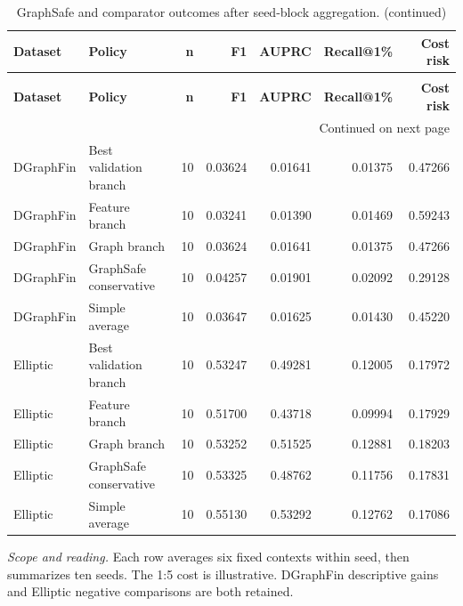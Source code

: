 \begingroup
\footnotesize
\setlength{\tabcolsep}{3pt}
\renewcommand{\arraystretch}{1.10}
\begin{longtable}{@{}p{} p{} r r r r r@{}}
\caption{GraphSafe and comparator outcomes after seed-block aggregation.}\label{tab:s-graphsafe-summary}\\
\toprule
\textbf{Dataset} & \textbf{Policy} & \textbf{n} & \textbf{F1} & \textbf{AUPRC} & \textbf{Recall@1\%} & \textbf{Cost risk} \\
\midrule
\endfirsthead
\caption[]{GraphSafe and comparator outcomes after seed-block aggregation. (continued)}\\
\toprule
\textbf{Dataset} & \textbf{Policy} & \textbf{n} & \textbf{F1} & \textbf{AUPRC} & \textbf{Recall@1\%} & \textbf{Cost risk} \\
\midrule
\endhead
\midrule
\multicolumn{7}{r}{\footnotesize Continued on next page}\\
\endfoot
\bottomrule
\endlastfoot
DGraphFin & Best validation branch & 10 & 0.03624 & 0.01641 & 0.01375 & 0.47266 \\
DGraphFin & Feature branch & 10 & 0.03241 & 0.01390 & 0.01469 & 0.59243 \\
DGraphFin & Graph branch & 10 & 0.03624 & 0.01641 & 0.01375 & 0.47266 \\
DGraphFin & GraphSafe conservative & 10 & 0.04257 & 0.01901 & 0.02092 & 0.29128 \\
DGraphFin & Simple average & 10 & 0.03647 & 0.01625 & 0.01430 & 0.45220 \\
Elliptic & Best validation branch & 10 & 0.53247 & 0.49281 & 0.12005 & 0.17972 \\
Elliptic & Feature branch & 10 & 0.51700 & 0.43718 & 0.09994 & 0.17929 \\
Elliptic & Graph branch & 10 & 0.53252 & 0.51525 & 0.12881 & 0.18203 \\
Elliptic & GraphSafe conservative & 10 & 0.53325 & 0.48762 & 0.11756 & 0.17831 \\
Elliptic & Simple average & 10 & 0.55130 & 0.53292 & 0.12762 & 0.17086 \\
\end{longtable}
\noindent\footnotesize\emph{Scope and reading.} Each row averages six fixed contexts within seed, then summarizes ten seeds. The 1:5 cost is illustrative. DGraphFin descriptive gains and Elliptic negative comparisons are both retained.\par
\endgroup
